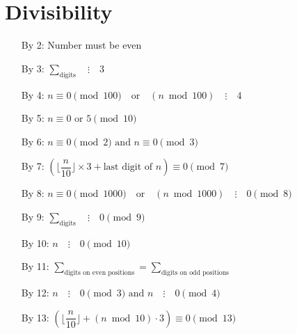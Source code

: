 \documentclass[12pt]{article}
\begin{document}
\section{Divisibility}
\begin{itemize}
	\item[By 2:] Number must be even
	\item[By 3:] $\sum_{\text{digits}} \quad \vdots \quad 3$
	\item[By 4:] $n \equiv 0 \pmod{100} \quad \text{or} \quad (n \bmod{100})
		\quad\vdots\quad 4$
	\item[By 5:] $n \equiv 0 \text{ or } 5 \pmod{10}$
	\item[By 6:] $n \equiv 0 \pmod{2} \text{ and } n \equiv 0 \pmod{3}$
	\item[By 7:] $\left(\lfloor\dfrac{n}{10}\rfloor \times 3 +
		\text{last digit of } n\right) \equiv 0 \pmod{7}$
	\item[By 8:] $n \equiv 0 \pmod{1000} \quad \text{or} \quad
		(n \bmod 1000) \quad \vdots \quad 0 \pmod{8}$
	\item[By 9:] $\sum_{\text{digits}} \quad \vdots \quad 0 \pmod{9}$
	\item[By 10:] $n \quad \vdots \quad 0 \pmod{10}$
	\item[By 11:] $\sum_{\text{digits on even positions}} = 
		\sum_{\text{digits on odd positions}}$
	\item[By 12:] $n \quad \vdots \quad 0 \pmod{3} \text{ and }
		n \quad \vdots \quad 0 \pmod{4}$
	\item[By 13:] $\left(\lfloor\dfrac{n}{10}\rfloor +
		(n \bmod 10) \cdot 3\right) \equiv 0 \pmod{13}$
\end{itemize}
\end{document}
